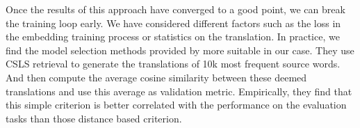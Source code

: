 \begin{itemize}
	Once the results of this approach have converged to a good point, we can break the training loop early. We have considered  different factors such as the loss in the embedding training process or statistics on the translation. In practice, we find the model selection methods provided by \cite{conneau2017word} more suitable in our case. They use CSLS retrieval to generate the translations of 10k most frequent source words. And then compute the average cosine similarity between these deemed translations and use this average as validation metric. Empirically, they find that this simple criterion is better correlated with the performance on the evaluation tasks than those distance based criterion.
\end{itemize}
